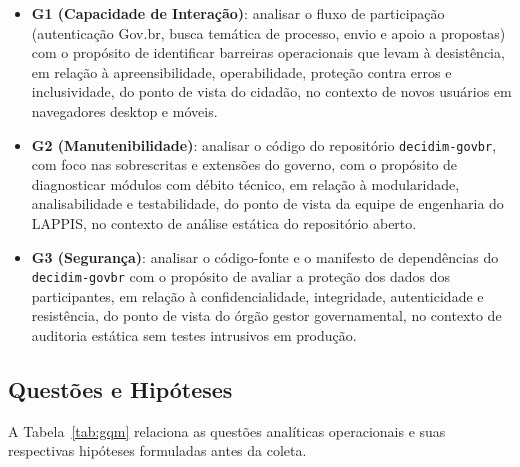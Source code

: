 \documentclass[journal]{IEEEtran}
\begin{document}
\begin{itemize}
    \item \textbf{G1 (Capacidade de Interação)}: analisar o fluxo de participação (autenticação Gov.br, busca temática de processo, envio e apoio a propostas) com o propósito de identificar barreiras operacionais que levam à desistência, em relação à apreensibilidade, operabilidade, proteção contra erros e inclusividade, do ponto de vista do cidadão, no contexto de novos usuários em navegadores desktop e móveis.
    \item \textbf{G2 (Manutenibilidade)}: analisar o código do repositório \texttt{decidim-govbr}, com foco nas sobrescritas e extensões do governo, com o propósito de diagnosticar módulos com débito técnico, em relação à modularidade, analisabilidade e testabilidade, do ponto de vista da equipe de engenharia do LAPPIS, no contexto de análise estática do repositório aberto.
    \item \textbf{G3 (Segurança)}: analisar o código-fonte e o manifesto de dependências do \texttt{decidim-govbr} com o propósito de avaliar a proteção dos dados dos participantes, em relação à confidencialidade, integridade, autenticidade e resistência, do ponto de vista do órgão gestor governamental, no contexto de auditoria estática sem testes intrusivos em produção.
\end{itemize}

\subsection{Questões e Hipóteses}
\label{sec:questoes}

A Tabela~\ref{tab:gqm} relaciona as questões analíticas operacionais e suas respectivas hipóteses formuladas antes da coleta.
\end{document}
